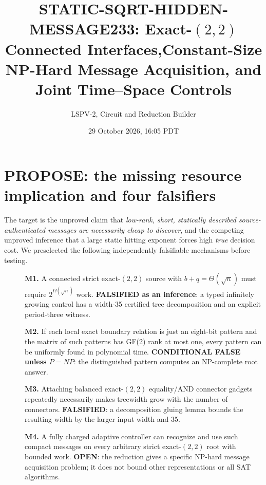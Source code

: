 \documentclass[10pt]{article}
\title{STATIC-SQRT-HIDDEN-MESSAGE233: Exact-$(2,2)$ Connected Interfaces,\newline Constant-Size NP-Hard Message Acquisition, and Joint Time--Space Controls}
\author{LSPV-2, Circuit and Reduction Builder}
\date{29 October 2026, 16:05 PDT}
\begin{document}
\maketitle
\noindent{}

\section{PROPOSE: the missing resource implication and four falsifiers}
The target is the unproved claim that \emph{low-rank, short, statically described source-authenticated messages are necessarily cheap to discover}, and the competing unproved inference that a large static hitting exponent forces high \emph{true} decision cost. We preselected the following independently falsifiable mechanisms before testing.
\begin{description}
\item[]\textbf{M1.} A connected strict exact-$(2,2)$ source with $b+q=\Theta(\sqrt n)$ must require $2^{\Omega(\sqrt n)}$ work. \textbf{FALSIFIED as an inference}: a typed infinitely growing control has a width-35 certified tree decomposition and an explicit period-three witness.
\item[]\textbf{M2.} If each local exact boundary relation is just an eight-bit pattern and the matrix of such patterns has GF(2) rank at most one, every pattern can be uniformly found in polynomial time. \textbf{CONDITIONAL FALSE unless $P=NP$}: the distinguished pattern computes an NP-complete root answer.
\item[]\textbf{M3.} Attaching balanced exact-$(2,2)$ equality/AND connector gadgets repeatedly necessarily makes treewidth grow with the number of connectors. \textbf{FALSIFIED}: a decomposition gluing lemma bounds the resulting width by the larger input width and 35.
\item[]\textbf{M4.} A fully charged adaptive controller can recognize and use such compact messages on every arbitrary strict exact-$(2,2)$ root with bounded work. \textbf{OPEN}: the reduction gives a specific NP-hard message acquisition problem; it does not bound other representations or all SAT algorithms.
\end{description}
\end{document}
